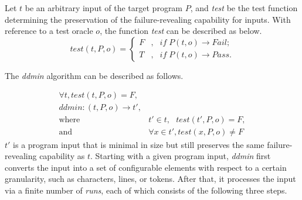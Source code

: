 Let $t$ be an arbitrary input of the target program $P$,
and \emph{test} be the test function determining the preservation of the failure-revealing capability for inputs.
With reference to a test oracle $o$, the function \emph{test} can be described as below.
\begin{equation}
test(t, P, o) = \left\{
\begin{aligned}
F &, & if \; P(t, o) \rightarrow Fail; \\
T &, & if \; P(t, o) \rightarrow Pass.   
\end{aligned}
\right.
\end{equation}

The \emph{ddmin} algorithm can be described as follows.

\begin{equation}
\begin{aligned}
\forall t, test(t,P,o) = F\text{,   } & \\ddmin: (t, P, o) \rightarrow t', &\\
\text{where } & t' \in t, \text{   } test(t',P,o) = F, \\
\text{and } & \forall x \in t', test(x,P,o) \neq F
\end{aligned}
\label{eq:dd}
\end{equation}
$t'$ is a program input that is minimal in size but still preserves the same failure-revealing capability as $t$.
Starting with a given program input, \emph{ddmin} first converts the input into a set of configurable elements with respect to a certain granularity, such as characters, lines, or tokens.
After that, it processes the input via a finite number of \emph{runs}, each of which consists of the following three steps.
 

